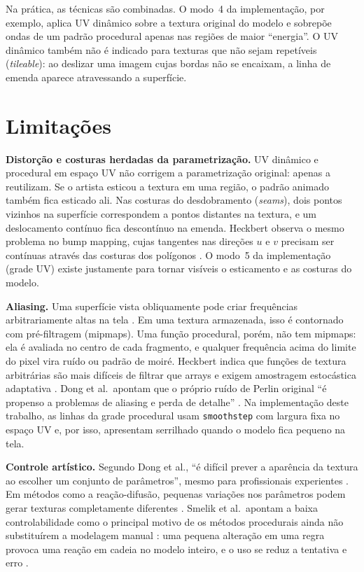 Na prática, as técnicas são combinadas. O modo~4 da implementação, por exemplo, aplica UV dinâmico sobre a textura original do modelo e sobrepõe ondas de um padrão procedural apenas nas regiões de maior ``energia''. O UV dinâmico também não é indicado para texturas que não sejam repetíveis (\textit{tileable}): ao deslizar uma imagem cujas bordas não se encaixam, a linha de emenda aparece atravessando a superfície.

\section{Limitações}
\label{sec:limitacoes}

\textbf{Distorção e costuras herdadas da parametrização.} UV dinâmico e procedural em espaço UV não corrigem a parametrização original: apenas a reutilizam. Se o artista esticou a textura em uma região, o padrão animado também fica esticado ali. Nas costuras do desdobramento (\textit{seams}), dois pontos vizinhos na superfície correspondem a pontos distantes na textura, e um deslocamento contínuo fica descontínuo na emenda. Heckbert observa o mesmo problema no bump mapping, cujas tangentes nas direções \(u\) e \(v\) precisam ser contínuas através das costuras dos polígonos \cite[p.~11]{heckbert1986}. O modo~5 da implementação (grade UV) existe justamente para tornar visíveis o esticamento e as costuras do modelo.

\textbf{Aliasing.} Uma superfície vista obliquamente pode criar frequências arbitrariamente altas na tela \cite[p.~6]{heckbert1986}. Em uma textura armazenada, isso é contornado com pré-filtragem (mipmaps). Uma função procedural, porém, não tem mipmaps: ela é avaliada no centro de cada fragmento, e qualquer frequência acima do limite do pixel vira ruído ou padrão de moiré. Heckbert indica que funções de textura arbitrárias são mais difíceis de filtrar que arrays e exigem amostragem estocástica adaptativa \cite[p.~11]{heckbert1986}. Dong et al.\ apontam que o próprio ruído de Perlin original ``é propenso a problemas de aliasing e perda de detalhe'' \cite[p.~13]{dong2020}. Na implementação deste trabalho, as linhas da grade procedural usam \texttt{smoothstep} com largura fixa no espaço UV e, por isso, apresentam serrilhado quando o modelo fica pequeno na tela.

\textbf{Controle artístico.} Segundo Dong et al., ``é difícil prever a aparência da textura ao escolher um conjunto de parâmetros'', mesmo para profissionais experientes \cite[p.~2]{dong2020}. Em métodos como a reação-difusão, pequenas variações nos parâmetros podem gerar texturas completamente diferentes \cite[p.~5]{dong2020}. Smelik et al.\ apontam a baixa controlabilidade como o principal motivo de os métodos procedurais ainda não substituírem a modelagem manual \cite[p.~1]{smelik2014}: uma pequena alteração em uma regra provoca uma reação em cadeia no modelo inteiro, e o uso se reduz a tentativa e erro \cite[p.~12]{smelik2014}.

